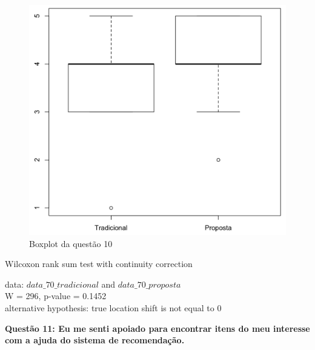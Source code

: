 \begin{figure}[htb]
  \caption{\label{fig:questao10-boxplot}Boxplot da questão 10}
  \begin{center}
      \includegraphics[scale=0.6]{./Figuras/questao10-boxplot.png}
  \end{center}
\end{figure}

Wilcoxon rank sum test with continuity correction

data:  $data\_70\_tradicional$ and $data\_70\_proposta$\\
W = 296, p-value = 0.1452\\
alternative hypothesis: true location shift is not equal to 0

\newpage
\textbf{Questão 11: Eu me senti apoiado para encontrar itens do meu interesse com a ajuda do sistema de recomendação.}

